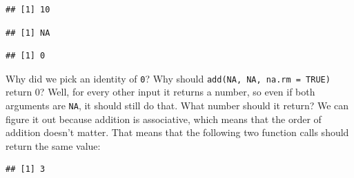 \begin{verbatim}
## [1] 10
\end{verbatim}

\begin{Shaded}
\begin{Highlighting}[]
\NormalTok{(}\NormalTok{, }\NormalTok{)}
\end{Highlighting}
\end{Shaded}

\begin{verbatim}
## [1] NA
\end{verbatim}

\begin{Shaded}
\begin{Highlighting}[]
\NormalTok{(}\NormalTok{, }\NormalTok{, } \NormalTok{)}
\end{Highlighting}
\end{Shaded}

\begin{verbatim}
## [1] 0
\end{verbatim}

Why did we pick an identity of \texttt{0}? Why should
\texttt{add(NA,\ NA,\ na.rm\ =\ TRUE)} return 0? Well, for every other
input it returns a number, so even if both arguments are \texttt{NA}, it
should still do that. What number should it return? We can figure it out
because addition is associative, which means that the order of addition
doesn't matter. That means that the following two function calls should
return the same value:

\begin{Shaded}
\begin{Highlighting}[]
\NormalTok{(}\NormalTok{(}\NormalTok{, }\NormalTok{, } \NormalTok{), }\NormalTok{, } \NormalTok{)}
\end{Highlighting}
\end{Shaded}

\begin{verbatim}
## [1] 3
\end{verbatim}

\begin{Shaded}
\begin{Highlighting}[]
\NormalTok{(}\NormalTok{, }\NormalTok{(}\NormalTok{, }\NormalTok{, } \NormalTok{), } \NormalTok{)}
\end{Highlighting}
\end{Shaded}


